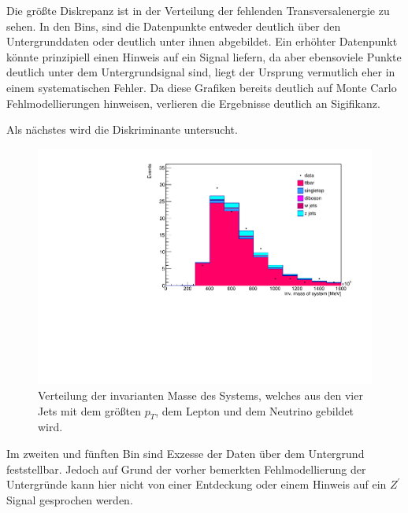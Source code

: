 Die größte Diskrepanz ist in der Verteilung der fehlenden Transversalenergie
zu sehen. In den Bins, sind die Datenpunkte entweder deutlich über den
Untergrunddaten oder deutlich unter ihnen abgebildet. Ein erhöhter Datenpunkt könnte
prinzipiell einen Hinweis auf ein Signal liefern, da aber ebensoviele
Punkte deutlich unter dem Untergrundsignal sind, liegt der Ursprung vermutlich
eher in einem systematischen Fehler. Da diese Grafiken bereits deutlich
auf Monte Carlo Fehlmodellierungen hinweisen, verlieren die Ergebnisse
deutlich an Sigifikanz. \par

Als nächstes wird die Diskriminante untersucht.

\begin{figure}[H]
    \centering
    \includegraphics[width=\linewidth]{plots_and_txt/stacked_plots/stacked_disc.pdf}
    \caption{Verteilung der invarianten Masse des Systems, welches aus den vier Jets mit dem größten $p_T$, dem Lepton und dem Neutrino gebildet wird.}
    \label{fig:stacked_disc}
\end{figure}

Im zweiten und fünften Bin sind Exzesse der Daten über dem Untergrund feststellbar.
Jedoch auf Grund der vorher bemerkten Fehlmodellierung der Untergründe kann
hier nicht von einer Entdeckung oder einem Hinweis auf ein $Z^\prime$ Signal
gesprochen werden.
